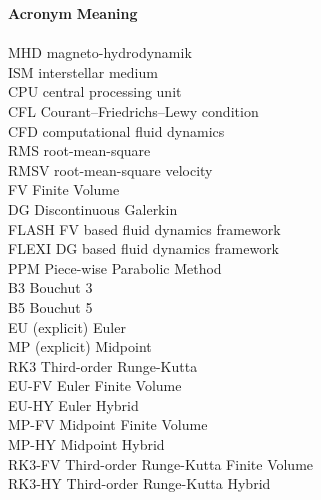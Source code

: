 \begin{tabbing}
\textbf{Acronym}    \hspace{2cm}\=\textbf{Meaning} \\\\

MHD             \> magneto-hydrodynamik \\
ISM             \> interstellar medium \\
CPU             \> central processing unit \\
CFL             \> Courant–Friedrichs–Lewy condition \\
CFD             \> computational fluid dynamics \\
RMS             \> root-mean-square \\
RMSV            \> root-mean-square velocity \\
FV              \> Finite Volume \\
DG              \> Discontinuous Galerkin \\
FLASH           \> FV based fluid dynamics framework \\
FLEXI           \> DG based fluid dynamics framework \\
PPM             \> Piece-wise Parabolic Method \\
B3              \> Bouchut 3 \\
B5              \> Bouchut 5 \\
EU              \> (explicit) Euler \\
MP              \> (explicit) Midpoint \\
RK3             \> Third-order Runge-Kutta \\
EU-FV           \> Euler Finite Volume \\
EU-HY           \> Euler Hybrid \\
MP-FV           \> Midpoint Finite Volume \\
MP-HY           \> Midpoint Hybrid \\
RK3-FV          \> Third-order Runge-Kutta Finite Volume \\
RK3-HY          \> Third-order Runge-Kutta Hybrid \\

\end{tabbing}
\newpage
